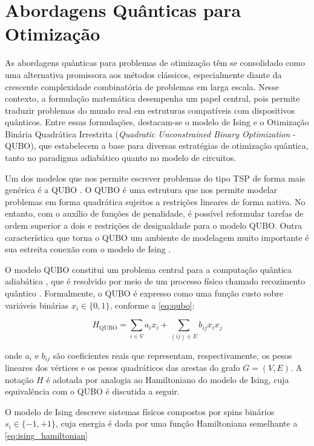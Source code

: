 \section{Abordagens Quânticas para Otimização}

As abordagens quânticas para problemas de otimização têm se consolidado como uma alternativa promissora aos métodos clássicos, especialmente diante da crescente complexidade combinatória de problemas em larga escala. Nesse contexto, a formulação matemática desempenha um papel central, pois permite traduzir problemas do mundo real em estruturas compatíveis com dispositivos quânticos. Entre essas formulações, destacam-se o modelo de Ising e o Otimização Binária Quadrática Irrestrita (\textit{Quadratic Unconstrained Binary Optimization} - QUBO), que estabelecem a base para diversas estratégias de otimização quântica, tanto no paradigma adiabático quanto no modelo de circuitos.
 
Um dos modelos que nos permite escrever problemas do tipo TSP de forma mais genérica é a QUBO \cite{lewis2017quadratic}. O QUBO é uma estrutura que nos permite modelar problemas em forma quadrática sujeitos a restrições lineares de forma nativa. No entanto, com o auxílio de funções de penalidade, é possível reformular tarefas de ordem superior a dois e restrições de desigualdade para o modelo QUBO. Outra característica que torna o QUBO um ambiente de modelagem muito importante é sua estreita conexão com o modelo de Ising \cite{cipra1987introduction}. 

O modelo QUBO constitui um problema central para a computação quântica adiabática \cite{mcgeoch2013experimental}, que é resolvido por meio de um processo físico chamado recozimento quântico \cite{mcgeoch2022adiabatic, brooke1999quantum}. Formalmente, o QUBO é expresso como uma função custo sobre variáveis binárias 
$x_i \in \{0,1\}$, conforme a \autoref{eq:qubo}:

\begin{equation}
    \label{eq:qubo}
    H_{\text{QUBO}}=\sum_{i\in V}a_ix_i+\sum_{(ij)\in E}b_{ij}x_ix_j
\end{equation}

\noindent onde $a_i$ e $b_{ij}$ são coeficientes reais que representam, respectivamente, os pesos lineares dos vértices e os pesos quadráticos das arestas do grafo $G = (V, E)$. A notação $H$ é adotada por analogia ao Hamiltoniano do modelo de Ising, cuja equivalência com o QUBO é discutida a seguir.

O modelo de Ising descreve sistemas físicos compostos por spins binários $s_i \in \{-1, +1\}$, cuja energia é dada por uma função Hamiltoniana semelhante a \autoref{eq:ising_hamiltonian}

